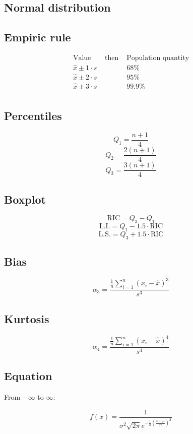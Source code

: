 \documentclass[letterpaper]{article}
\newcommand{\divline}{\noindent\makebox[\linewidth]{\rule{\textwidth}{0.4pt}}}
\begin{document}
    \divline
    \begin{multicols}{2}
        \section{Normal distribution}

        \subsection{Empiric rule}

        \begin{align*}
            \text{Value} & \text{ then } & \text{Population quantity} \\
            \hat{x} \pm 1 \cdot s & & 68\% \\
            \hat{x} \pm 2 \cdot s & & 95\% \\
            \hat{x} \pm 3 \cdot s & & 99.9\% \\
        \end{align*}

        \subsection{Percentiles}

        \[Q_{1} = \frac{n+1}{4}\]
        \[Q_{2} = \frac{2(n+1)}{4}\]
        \[Q_{3} = \frac{3(n+1)}{4}\]

        \subsection{Boxplot}

        \[\text{RIC} = Q_{3} - Q_{1}\]
        \[\text{L.I.}  = Q_{1} - 1.5 \cdot \text{RIC}\]
        \[\text{L.S.}  = Q_{3} + 1.5 \cdot \text{RIC}\]

        \subsection{Bias}

        \[\alpha_{3} = \frac{\frac{1}{n} \sum_{i = 1}^{n} (x_{i} - \hat{x})^{3}}{s^{3}}\]

        \subsection{Kurtosis}

        \[\alpha_{4} = \frac{\frac{1}{n} \sum_{i = 1}^{n} (x_{i} - \hat{x})^{4}}{s^{4}}\]

        \subsection{Equation}

        From \(-\infty\) to \(\infty\):

        \[f(x) = \frac{1}{\sigma^{2} \sqrt{2\pi} e^{-\frac{1}{2} \left( \frac{x - \mu}{\sigma^{2}} \right)^{2}} }\]
    \end{multicols}
\end{document}
